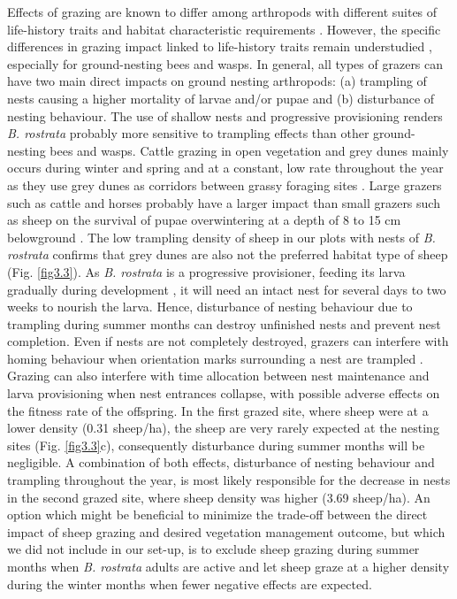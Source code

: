 \documentclass[10pt, twoside]{book} %
\begin{document}
	Effects of grazing are known to differ among arthropods with different suites of life-history traits and habitat characteristic requirements \citep{vannoordwijk2012, vanklink2015}. However, the specific differences in grazing impact linked to life-history traits remain understudied \citep{iida2016}, especially for ground-nesting bees and wasps. In general, all types of grazers can have two main direct impacts on ground nesting arthropods: (a) trampling of nests causing a higher mortality of larvae and/or pupae and (b) disturbance of nesting behaviour. The use of shallow nests and progressive provisioning renders \textit{B. rostrata} probably more sensitive to trampling effects than other ground-nesting bees and wasps. Cattle grazing in open vegetation and grey dunes mainly occurs during winter and spring and at a constant, low rate throughout the year as they use grey dunes as corridors between grassy foraging sites \citep{lamoot2005, bonte2005}. Large grazers such as cattle and horses probably have a larger impact than small grazers such as sheep \citep{adams1975, metera2010, pakeman2020} on the survival of pupae overwintering at a depth of 8 to 15 cm belowground \citep{nielsen1945, blosch2000}. The low trampling density of sheep in our plots with nests of \textit{B. rostrata} confirms that grey dunes are also not the preferred habitat type of sheep (Fig. \ref{fig3.3}). As \textit{B. rostrata} is a progressive provisioner, feeding its larva gradually during development \citep{nielsen1945, field2005}, it will need an intact nest for several days to two weeks to nourish the larva. Hence, disturbance of nesting behaviour due to trampling during summer months can destroy unfinished nests and prevent nest completion. Even if nests are not completely destroyed, grazers can interfere with homing behaviour when orientation marks surrounding a nest are trampled \citep{tinbergen1932a, schone1993}. Grazing can also interfere with time allocation between nest maintenance and larva provisioning when nest entrances collapse, with possible adverse effects on the fitness rate of the offspring. In the first grazed site, where sheep were at a lower density (0.31 sheep/ha), the sheep are very rarely expected at the nesting sites (Fig. \ref{fig3.3}c), consequently disturbance during summer months will be negligible. A combination of both effects, disturbance of nesting behaviour and trampling throughout the year, is most likely responsible for the decrease in nests in the second grazed site, where sheep density was higher (3.69 sheep/ha). An option which might be beneficial to minimize the trade-off between the direct impact of sheep grazing and desired vegetation management outcome, but which we did not include in our set-up, is to exclude sheep grazing during summer months when \textit{B. rostrata} adults are active and let sheep graze at a higher density during the winter months when fewer negative effects are expected.\\
	
\end{document}
